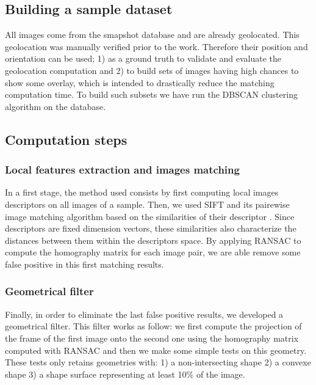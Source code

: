 \documentclass[fleqn,10pt]{wlpeerj} %
\begin{document}
\subsection*{Building a sample dataset}
All images come from the smapshot database and are already geolocated. 
This geolocation was manually verified prior to the work. 
Therefore their position and orientation can be used; 
1) as a ground truth to  validate and evaluate the geolocation computation and 
2) to build sets of images having high chances to show some overlay, 
which is intended to drastically reduce the matching computation time. 
To build such subsets we have run the DBSCAN clustering algorithm 
\citep{ester1996} on the database.

\subsection*{Computation steps}


\subsubsection*{Local features extraction and images matching}
In a first stage, 
the method used consists by first computing local images descriptors on all 
images of a sample. 
Then, we used SIFT and its pairewise image matching algorithm based on the 
similarities of their descriptor \citep{lowe1999}. 
Since descriptors are fixed dimension vectors, these similarities also characterize 
the distances between them within the descriptors space. 
By applying RANSAC \citep{fischler1981} to compute the homography matrix for each 
image pair, we are able remove some false positive in this first matching results.
 

\subsubsection*{Geometrical filter}
Finally, in order to eliminate the last false positive results, we developed 
a geometrical filter.
This filter works as follow: we first compute the projection of the frame of the first
image onto the second one using the  homography matrix computed with RANSAC and then
we make some simple tests on this geometry. These tests only retains geometries with:
1) a non-intersecting shape
2) a convexe shape
3) a shape surface representing at least 10\% of the image.

\end{document}
